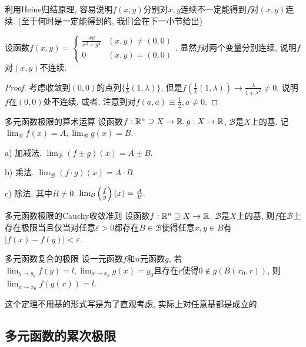 利用Heine归结原理, 容易说明$f(x,y)$分别对$x,y$连续不一定能得到$f$对$(x,y)$连续. (至于何时是一定能得到的, 我们会在下一小节给出)

\begin{example}
	设函数$f(x,y) = \begin{cases}
 \frac{xy}{x^2+y^2} &  (x,y) \neq (0,0) \\
 0 &  (x,y) = (0,0)
\end{cases}$. 显然$f$对两个变量分别连续, 说明$f$对$(x,y)$不连续. 
\end{example}
\begin{proof}
	考虑收敛到$(0,0)$的点列$\{ \frac{1}{k}(1,\lambda) \}$, 但是$f(\frac{1}{k}(1,\lambda)) \to \frac{\lambda}{1+\lambda ^2} \neq 0$, 说明$f$在$(0,0)$处不连续. 或者, 注意到对$f(a,a) \equiv \frac{1}{2}, a \neq 0$. 
\end{proof}

\begin{theorem}{多元函数极限的算术运算}
	设函数$f:\mathbb{R} ^n \supseteq X \to \mathbb{R}, g:X \to \mathbb{R}$, $\mathcal{B}$是$X$上的基. 记$\lim_{\mathcal{B}} f(x) = A, \lim_{\mathcal{B}} g(x) = B$. 
	
	a) 加减法. $\lim_{\mathcal{B}} (f\pm g)(x) = A\pm B.$
	
	b) 乘法. $\lim_{\mathcal{B}} (f\cdot g)(x) = A \cdot B.$
	
	c) 除法, 其中$B\neq 0$. $\lim_{\mathcal{B}} \left( \frac{f}{g} \right)(x) = \frac{A}{B}.$
\end{theorem}

\begin{theorem}{多元函数极限的Cauchy收敛准则}
	设函数$f:\mathbb{R} ^n \supseteq X \to \mathbb{R}$, $\mathcal{B}$是$X$上的基, 则$f$在$\mathcal{B}$上存在极限当且仅当对任意$\varepsilon >0$都存在$B \in \mathcal{B}$使得任意$x,y \in B$有$|f(x)-f(y)|<\varepsilon$. 
\end{theorem}

\begin{theorem}{多元函数复合的极限}
	设一元函数$f$和$n$元函数$g$, 若$\lim_{y\to y_0} f(y)=l, \lim_{x \to x_0}g(x) = y_0$且存在$r$使得$0 \notin g(B(x_0,r))$, 则$\lim_{x \to x_0} f(g(x)) = l$. 
\end{theorem}
\begin{remark}
	这个定理不用基的形式写是为了直观考虑, 实际上对任意基都是成立的. 
\end{remark}

\subsection{多元函数的累次极限}

